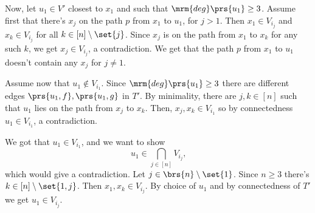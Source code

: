 \documentclass[10pt]{article}
\begin{document}
\begin{solution}
Now, let $u_1 \in V'$ closest to $x_1$ and such that $\mrm{deg}\prs{u_1} \geq 3$.
Assume first that there's $x_j$ on the path $p$ from $x_1$ to $u_1$, for $j > 1$. Then $x_1 \in V_{i_j}$ and $x_k \in V_{i_j}$ for all $k \in [n] \setminus \set{j}$. Since $x_j$ is on the path from $x_1$ to $x_k$ for any such $k$, we get $x_j \in V_{i_j}$, a contradiction.
We get that the path $p$ from $x_1$ to $u_1$ doesn't contain any $x_j$ for $j \neq 1$. 

Assume now that $u_1 \notin V_{i_1}$. Since $\mrm{deg}\prs{u_1} \geq 3$ there are different edges $\prs{u_1, f}, \prs{u_1, g}$ in $T'$. By minimality, there are $j,k \in [n]$ such that $u_1$ lies on the path from $x_j$ to $x_k$. Then, $x_j, x_k \in V_{i_1}$ so by connectedness $u_1 \in V_{i_1}$, a contradiction.

We got that $u_1 \in V_{i_1}$, and we want to show \[u_1 \in \bigcap_{j \in [n]} V_{i_j}\text{,}\] which would give a contradiction.
Let $j \in \brs{n} \setminus \set{1}$. Since $n \geq 3$ there's $k \in [n] \setminus \set{1,j}$. Then $x_1, x_k \in V_{i_j}$. By choice of $u_1$ and by connectedness of $T'$ we get $u_1 \in V_{i_j}$.

\end{solution}
\end{document}
